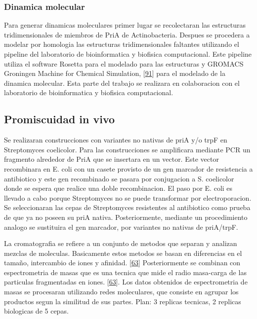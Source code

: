 \documentclass[12pt,twoside]{reedthesis}
\begin{document}
  \subsubsection{Dinamica molecular}\label{dinamica-molecular}
  
  Para generar dinamicas moleculares primer lugar se recolectaran las
  estructuras tridimensionales de miembros de PriA de Actinobacteria.
  Despues se procedera a modelar por homologia las estructuras
  tridimensionales faltantes utilizando el pipeline del laboratorio de
  bioinformatica y biofisica computacional. Este pipeline utiliza el
  software Rosetta para el modelado para las estructuras y GROMACS
  Groningen Machine for Chemical Simulation,
  {[}\protect\hyperlink{ref-van_der_spoel_gromacs_2005}{91}{]} para el
  modelado de la dinamica molecular. Esta parte del trabajo se realizara
  en colaboracion con el laboratorio de bioinformatica y biofisica
  computacional.
  
  \subsection{Promiscuidad in vivo}\label{promiscuidad-in-vivo}
  
  Se realizaran construcciones con variantes no nativas de priA y/o trpF
  en Streptomyces coelicolor. Para las construcciones se amplificara
  mediante PCR un fragmento alrededor de PriA que se insertara en un
  vector. Este vector recombinara en E. coli con un casete provisto de un
  gen marcador de resistencia a antibiotico y este gen recombinado se
  pasara por conjugacion a S. coelicolor donde se espera que realice una
  doble recombinacion. El paso por E. coli es llevado a cabo porque
  Streptomyces no se puede transformar por electroporacion. Se
  seleccionaran las cepas de Streptomyces resistentes al antibiotico como
  prueba de que ya no poseen su priA nativa. Posteriormente, mediante un
  procedimiento analogo se sustituira el gen marcador, por variantes no
  nativas de priA/trpF.
  
  La cromatografia se refiere a un conjunto de metodos que separan y
  analizan mezclas de moleculas. Basicamente estos metodos se basan en
  diferencias en el tamaño, intercambio de iones y afinidad.
  {[}\protect\hyperlink{ref-campbell_biophysical_2012}{63}{]}
  Posteriormente se combinan con espectrometria de masas que es una
  tecnica que mide el radio masa-carga de las particulas fragmentadas en
  iones. {[}\protect\hyperlink{ref-campbell_biophysical_2012}{63}{]}. Los
  datos obtenidos de espectrometria de masas se procesaran utilizando
  redes moleculares, que consiste en agrupar los productos segun la
  similitud de sus partes. Plan: 3 replicas tecnicas, 2 replicas
  biologicas de 5 cepas.
  
\end{document}
